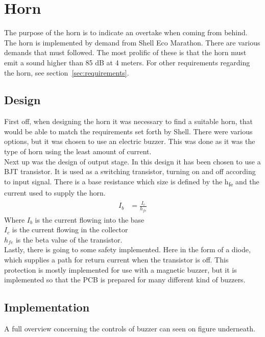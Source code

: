 \section{Horn}
The purpose of the horn is to indicate an overtake when coming from behind. The horn is implemented by demand from Shell Eco Marathon. There are various demands that must followed. The most prolific of these is that the horn must emit a sound higher than 85 dB at 4 meters. For other requirements regarding the horn, see section~\ref{sec:requirements}.  

\subsection{Design}
First off, when designing the horn it was necessary to find a suitable horn, that would be able to match the requirements set forth by Shell. There were various options, but it was chosen to use an electric buzzer. This was done as it was the type of horn using the least amount of current. \\
Next up was the design of output stage. In this design it has been chosen to use a BJT transistor. It is used as a switching transistor, turning on and off according to input signal. There is a base resistance which size is defined by the h\textsubscript{fe} and the current used to supply the horn. \\
\begin{align}
	\begin{split}
		I_b &= \frac{I_c}{h_{fe}}
	\end{split}
\end{align}
Where $I_b$ is the current flowing into the base \\ 
$I_c$ is the current flowing in the collector \\ 
$h_{fe}$ is the beta value of the transistor. \\

Lastly, there is going to some safety implemented. Here in the form of a diode, which supplies a path for return current when the transistor is off. This protection is mostly implemented for use with a magnetic buzzer, but it is implemented so that the PCB is prepared for many different kind of buzzers.   

\subsection{Implementation}
A full overview concerning the controls of buzzer can seen on figure underneath.

